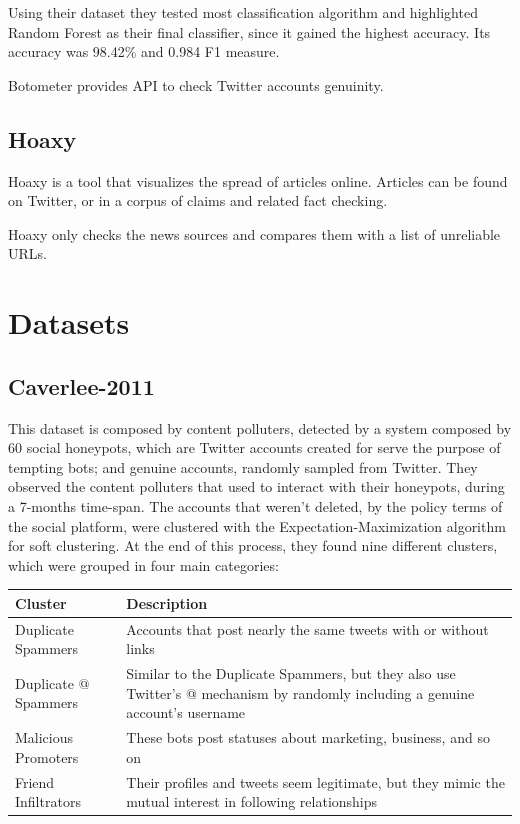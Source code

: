 Using their dataset they tested most classification algorithm and highlighted Random Forest as their final classifier, since it gained the highest accuracy. Its accuracy was 98.42\% and 0.984 F1 measure\cite{Lee11sevenmonths}.

Botometer provides API to check Twitter accounts genuinity.

\subsection{Hoaxy}
Hoaxy is a tool that visualizes the spread of articles online. Articles can be found on Twitter, or in a corpus of claims and related fact checking.

Hoaxy only checks the news sources and compares them with a list of unreliable URLs.

\section{Datasets}

\subsection{Caverlee-2011}
This dataset is composed by content polluters, detected by a system composed by 60 social honeypots, which are Twitter accounts created for serve the purpose of tempting bots; and genuine accounts, randomly sampled from Twitter.
They observed the content polluters that used to interact with their honeypots, during a 7-months time-span. The accounts that weren't deleted, by the policy terms of the social platform, were clustered with the Expectation-Maximization algorithm for soft clustering. At the end of this process, they found nine different clusters, which were grouped in four main categories:

\begin{center}
	\begin{tabular}{>{\raggedright\arraybackslash}m{5.5cm}|>{\raggedright\arraybackslash}m{5.5cm}}
		\\Cluster&Description\\
		\hline\hline
		Duplicate Spammers & Accounts that post nearly the same tweets with or without links\\\hline
		Duplicate @ Spammers & Similar to the Duplicate Spammers, but they also use Twitter’s @ mechanism by randomly including a genuine account’s username\\\hline
		Malicious Promoters & These bots post statuses about marketing, business, and so on\\\hline
		Friend Infiltrators & Their profiles and tweets seem legitimate, but they mimic the mutual interest in following relationships\\\hline
	\end{tabular}
\end{center}

